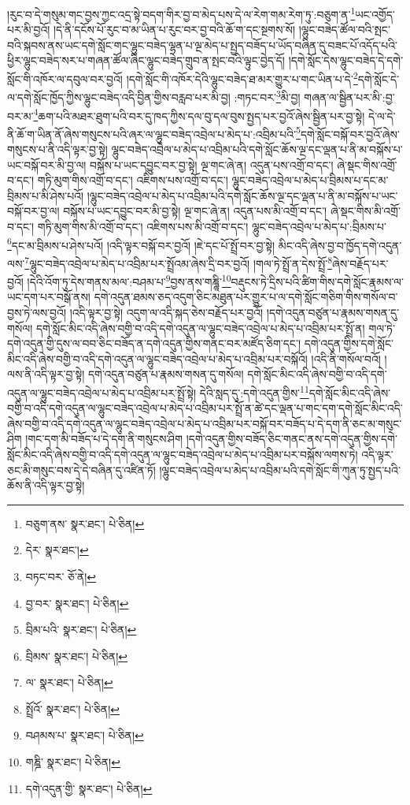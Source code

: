 །རུང་བ་དེ་གསུམ་གང་བྱས་ཀྱང་འདྲ་སྟེ་བདག་གིར་བྱ་བ་མེད་པས་དེ་ལ་རེག་གམ་རེག་ཏུ་:བཅུག་ན་\footnote{བཅུག་ནས་  སྣར་ཐང་།  པེ་ཅིན། }ཡང་འགྱོད་པར་མི་བྱའོ། །དེ་ནི་དངོས་པོ་རུང་བ་མ་ཡིན་པ་རུང་བར་བྱ་བའི་ཆོ་ག་དང་སྔགས་སོ། །ལྷུང་བཟེད་ཚོལ་བའི་སྤང་བའི་སྐབས་ནས་ཡང་དགེ་སློང་གང་ལྷུང་བཟེད་ལྷན་པ་ལྔ་མེད་པ་སྤྱད་བཟོད་པ་ཡོད་བཞིན་དུ་བཟང་པོ་འདོད་པའི་ཕྱིར་ལྷུང་བཟེད་སར་པ་གཞན་ཚོལ་ཞིང་ལྷུང་བཟེད་གྲུབ་ན་སྤང་བའི་ལྟུང་བྱེད་དོ། །དགེ་སློང་དེས་ལྷུང་བཟེད་དེ་དགེ་སློང་གི་འཁོར་ལ་དབུལ་བར་བྱའོ། །དགེ་སློང་གི་འཁོར་དེའི་ལྷུང་བཟེད་ཐ་མར་གྱུར་པ་གང་ཡིན་པ་དེ་\footnote{དེར་  སྣར་ཐང་། }དགེ་སློང་དེ་ལ་དགེ་སློང་ཁྱོད་ཀྱིས་ལྷུང་བཟེད་འདི་བྱིན་གྱིས་བརླབ་པར་མི་བྱ། :གཏང་བར་\footnote{བཏང་བར་  ཅོ་ནེ། }མི་བྱ། གཞན་ལ་སྦྱིན་པར་མི་:བྱ་བར་མ་\footnote{བྱ་བར་  སྣར་ཐང་།  པེ་ཅིན། }ཆག་པའི་མཐར་ཐུག་པའི་བར་དུ་ཁད་ཀྱིས་དལ་བུ་དལ་བུས་སྤྱད་པར་བྱའོ་ཞེས་སྦྱིན་པར་བྱ་སྟེ། དེ་ལ་དེ་ནི་ཆོ་ག་ཡིན་ནོ་ཞེས་གསུངས་པའི་ཞར་ལ་ལྷུང་བཟེད་འབྲེལ་པ་མེད་པ་:འབྲིམ་པའི་\footnote{བྲིམ་པའི་  སྣར་ཐང་།  པེ་ཅིན། }དགེ་སློང་བསྐོ་བར་བྱའོ་ཞེས་གསུངས་པ་ནི་འདི་ལྟར་བྱ་སྟེ། ལྷུང་བཟེད་འབྲེལ་པ་མེད་པ་འབྲིམ་པའི་དགེ་སློང་ཆོས་ལྔ་དང་ལྡན་པ་ནི་མ་བསྐོས་པ་ཡང་བསྐོ་བར་མི་བྱ་ལ། བསྐོས་པ་ཡང་དབྱུང་བར་བྱ་སྟེ། ལྔ་གང་ཞེ་ན། འདུན་པས་འགྲོ་བ་དང་། ཞེ་སྡང་གིས་འགྲོ་བ་དང་། གཏི་མུག་གིས་འགྲོ་བ་དང་། འཇིགས་པས་འགྲོ་བ་དང་། ལྷུང་བཟེད་འབྲེལ་པ་མེད་པ་བྲིམས་པ་དང་མ་བྲིམས་པ་མི་ཤེས་པའོ། །ལྷུང་བཟེད་འབྲེལ་པ་མེད་པ་འབྲིམ་པའི་དགེ་སློང་ཆོས་ལྔ་དང་ལྡན་པ་ནི་མ་བསྐོས་པ་ཡང་བསྐོ་བར་བྱ་ལ། བསྐོས་པ་ཡང་དབྱུང་བར་མི་བྱ་སྟེ། ལྔ་གང་ཞེ་ན། འདུན་པས་མི་འགྲོ་བ་དང་། ཞེ་སྡང་གིས་མི་འགྲོ་བ་དང་། གཏི་མུག་གིས་མི་འགྲོ་བ་དང་། འཇིགས་པས་མི་འགྲོ་བ་དང་། ལྷུང་བཟེད་འབྲེལ་པ་མེད་པ་:བྲིམས་པ་\footnote{བྲིམས་  སྣར་ཐང་།  པེ་ཅིན། }དང་མ་བྲིམས་པ་ཤེས་པའོ། །འདི་ལྟར་བསྐོ་བར་བྱའོ། །ཇེ་དང་པོ་སྤྲོ་བར་བྱ་སྟེ། མིང་འདི་ཞེས་བྱ་བ་ཁྱོད་དགེ་འདུན་ལས་\footnote{ལ་  སྣར་ཐང་།  པེ་ཅིན། }ལྷུང་བཟེད་འབྲེལ་པ་མེད་པ་འབྲིམ་པར་སྤྲོའམ་ཞེས་དྲི་བར་བྱའོ། །གལ་ཏེ་སྤྲོ་ན་དེས་སྤྲོ་\footnote{སྤྲོའོ་  སྣར་ཐང་།  པེ་ཅིན། }ཞེས་བརྗོད་པར་བྱའོ། །དེའི་འོག་ཏུ་དེས་གནས་མལ་:བཤམ་པ་\footnote{བཤམས་པ་  སྣར་ཐང་།  པེ་ཅིན། }བྱས་ནས་གཎྜཱི་\footnote{གཎྜི་  སྣར་ཐང་།  པེ་ཅིན། }བརྡུངས་ཏེ་དྲིས་པའི་ཚིག་གིས་དགེ་སློང་རྣམས་ལ་ཡང་དག་པར་བསྒོ་ནས། དགེ་འདུན་ཐམས་ཅད་འདུག་ཅིང་མཐུན་པར་གྱུར་པ་ལ་དགེ་སློང་གཅིག་གིས་གསོལ་བ་བྱས་ཏེ་ལས་བྱའོ། །འདི་ལྟར་བྱ་སྟེ། འདུག་ལ་འདི་སྐད་ཅེས་བརྗོད་པར་བྱའོ། །དགེ་འདུན་བཙུན་པ་རྣམས་གསན་དུ་གསོལ། དགེ་སློང་མིང་འདི་ཞེས་བགྱི་བ་འདི་དགེ་འདུན་ལ་ལྷུང་བཟེད་འབྲེལ་པ་མེད་པ་འབྲིམ་པར་སྤྲོ་ན། གལ་ཏེ་དགེ་འདུན་གྱི་དུས་ལ་བབ་ཅིང་བཟོད་ན་དགེ་འདུན་གྱིས་གནང་བར་མཛོད་ཅིག་དང་། དགེ་འདུན་གྱིས་དགེ་སློང་མིང་འདི་ཞེས་བགྱི་བ་འདི་དགེ་འདུན་ལ་ལྷུང་བཟེད་འབྲེལ་པ་མེད་པ་འབྲིམ་པར་བསྐོའོ། །འདི་ནི་གསོལ་བའོ། །ལས་ནི་འདི་ལྟར་བྱ་སྟེ། དགེ་འདུན་བཙུན་པ་རྣམས་གསན་དུ་གསོལ། དགེ་སློང་མིང་འདི་ཞེས་བགྱི་བ་འདི་དགེ་འདུན་ལ་ལྷུང་བཟེད་འབྲེལ་པ་མེད་པ་འབྲིམ་པར་སྤྲོ་སྟེ། དེའི་སླད་དུ་:དགེ་འདུན་གྱིས་\footnote{དགེ་འདུན་གྱི་  སྣར་ཐང་།  པེ་ཅིན། }དགེ་སློང་མིང་འདི་ཞེས་བགྱི་བ་འདི་དགེ་འདུན་ལ་ལྷུང་བཟེད་འབྲེལ་པ་མེད་པ་འབྲིམ་པར་སྤྲོ་ན་ཚེ་དང་ལྡན་པ་གང་དག་དགེ་སློང་མིང་འདི་ཞེས་བགྱི་བ་འདི་དགེ་འདུན་ལ་ལྷུང་བཟེད་འབྲེལ་པ་མེད་པ་འབྲིམ་པར་བསྐོ་བར་བཟོད་པ་དེ་དག་ནི་ཅང་མ་གསུང་ཤིག །གང་དག་མི་བཟོད་པ་དེ་དག་ནི་གསུངས་ཤིག །དགེ་འདུན་གྱིས་བཟོད་ཅིང་གནང་ནས་དགེ་འདུན་གྱིས་དགེ་སློང་མིང་འདི་ཞེས་བགྱི་བ་འདི་དགེ་འདུན་ལ་ལྷུང་བཟེད་འབྲེལ་པ་མེད་པ་འབྲིམ་པར་བསྐོས་ལགས་ཏེ། འདི་ལྟར་ཅང་མི་གསུང་བས་དེ་དེ་བཞིན་དུ་འཛིན་ཏོ། །ལྷུང་བཟེད་འབྲེལ་པ་མེད་པ་འབྲིམ་པའི་དགེ་སློང་གི་ཀུན་ཏུ་སྤྱད་པའི་ཆོས་ནི་འདི་ལྟར་བྱ་སྟེ། 